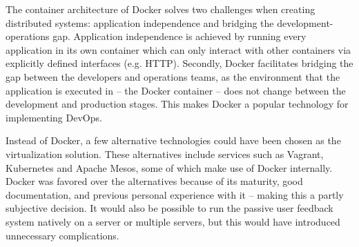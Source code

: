 


The container architecture of Docker solves two challenges when creating distributed systems: application independence and bridging the development-operations gap.
Application independence is achieved by running every application in its own container which can only interact with other containers via explicitly defined interfaces (e.g. HTTP).
Secondly, Docker facilitates bridging the gap between the developers and operations teams, as the environment that the application is executed in -- the Docker container -- does not change between the development and production stages.
This makes Docker a popular technology for implementing DevOps.

Instead of Docker, a few alternative technologies could have been chosen as the virtualization solution.
These alternatives include services such as Vagrant, Kubernetes and Apache Mesos, some of which make use of Docker internally.
Docker was favored over the alternatives because of its maturity, good documentation, and previous personal experience with it -- making this a partly subjective decision.
It would also be possible to run the passive user feedback system natively on a server or multiple servers, but this would have introduced unnecessary complications.